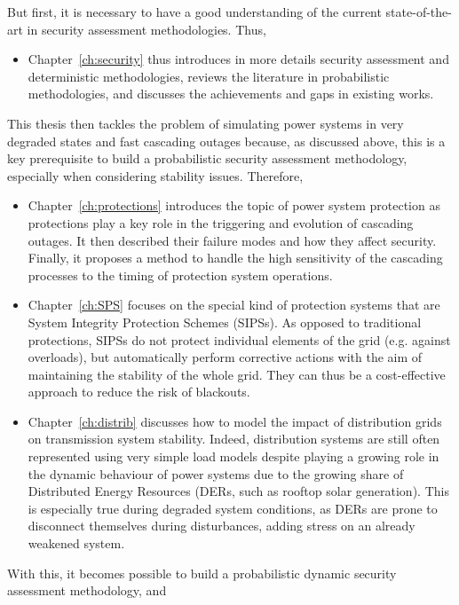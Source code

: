 But first, it is necessary to have a good understanding of the current state-of-the-art in security assessment methodologies. Thus,

\begin{itemize}
    \item Chapter~\ref{ch:security} thus introduces in more details security assessment and deterministic methodologies, reviews the literature in probabilistic methodologies, and discusses the achievements and gaps in existing works.
\end{itemize}

This thesis then tackles the problem of simulating power systems in very degraded states and fast cascading outages because, as discussed above, this is a key prerequisite to build a probabilistic security assessment methodology, especially when considering stability issues. Therefore,

\begin{itemize}
    \item Chapter~\ref{ch:protections} introduces the topic of power system protection as protections play a key role in the triggering and evolution of cascading outages. It then described their failure modes and how they affect security. Finally, it proposes a method to handle the high sensitivity of the cascading processes to the timing of protection system operations.
    \item Chapter~\ref{ch:SPS} focuses on the special kind of protection systems that are System Integrity Protection Schemes (SIPSs). As opposed to traditional protections, SIPSs do not protect individual elements of the grid (e.g. against overloads), but automatically perform corrective actions with the aim of maintaining the stability of the whole grid. They can thus be a cost-effective approach to reduce the risk of blackouts.
    \item Chapter~\ref{ch:distrib} discusses how to model the impact of distribution grids on transmission system stability. Indeed, distribution systems are still often represented using very simple load models despite playing a growing role in the dynamic behaviour of power systems due to the growing share of Distributed Energy Resources (DERs, such as rooftop solar generation). This is especially true during degraded system conditions, as DERs are prone to disconnect themselves during disturbances, adding stress on an already weakened system.
\end{itemize}

With this, it becomes possible to build a probabilistic dynamic security assessment methodology, and

